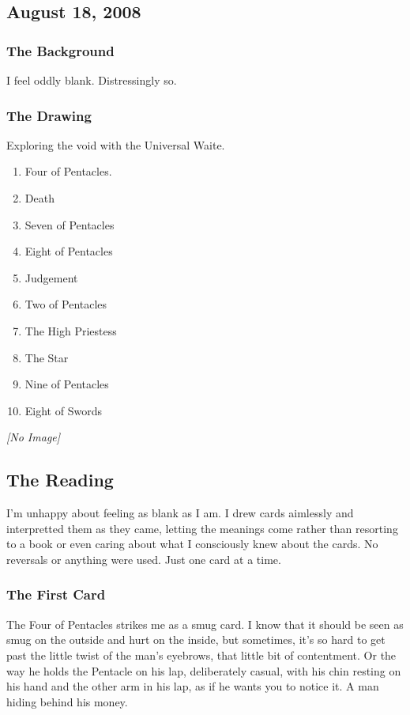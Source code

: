 \subsection{August 18, 2008}
\subsubsection*{The Background}
I feel oddly blank.  Distressingly so.

\subsubsection*{The Drawing}
Exploring the void with the Universal Waite\cite{tarotRWS}.

\begin{enumerate}
  \item Four of Pentacles.
  \item Death
  \item Seven of Pentacles
  \item Eight of Pentacles
  \item Judgement
  \item Two of Pentacles
  \item The High Priestess
  \item The Star
  \item Nine of Pentacles
  \item Eight of Swords
\end{enumerate}
\emph{[No Image]}

\subsection*{The Reading}
I'm unhappy about feeling as blank as I am.  I drew cards aimlessly and
interpretted them as they came, letting the meanings come rather than
resorting to a book or even caring about what I consciously knew about
the cards.  No reversals or anything were used.  Just one card at a
time.

\subsubsection*{The First Card}
The Four of Pentacles strikes me as a smug card.  I know that it should
be seen as smug on the outside and hurt on the inside, but sometimes,
it's so hard to get past the little twist of the man's eyebrows, that
little bit of contentment.  Or the way he holds the Pentacle on his lap,
deliberately casual, with his chin resting on his hand and the other arm
in his lap, as if he wants you to notice it.  A man hiding behind his
money.

